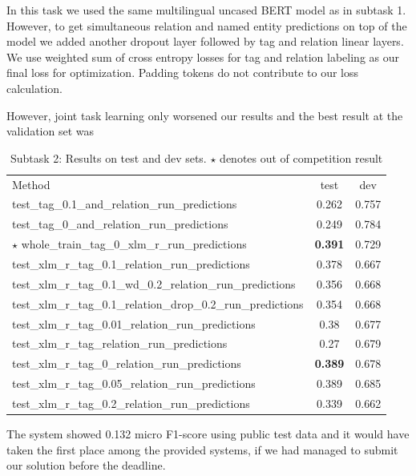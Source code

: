 \documentclass{dialogue}
\begin{document}
	In this task we used the same multilingual uncased BERT model as in subtask 1. However, to get simultaneous relation and named entity predictions on top of the model we added another dropout layer followed by tag and relation linear layers. We use weighted sum of cross entropy losses for tag and relation labeling as our final loss for optimization. Padding tokens do not contribute to our loss calculation.
	
	However, joint task learning only worsened our results and the best result at the validation set was
	
	\begin{table}[t!]
		\centering
		\scriptsize
		\begin{tabular}{lcc}%

			Method & test & dev \\

			test\_tag\_0.1\_and\_relation\_run\_predictions & 0.262 & 0.757 \\
			test\_tag\_0\_and\_relation\_run\_predictions & 0.249 & 0.784 \\

			$\star$ whole\_train\_tag\_0\_xlm\_r\_run\_predictions & {\bf 0.391} & 0.729 \\

			test\_xlm\_r\_tag\_0.1\_relation\_run\_predictions & 0.378 & 0.667 \\
			test\_xlm\_r\_tag\_0.1\_wd\_0.2\_relation\_run\_predictions & 0.356 & 0.668 \\
			test\_xlm\_r\_tag\_0.1\_relation\_drop\_0.2\_run\_predictions & 0.354 & 0.668 \\

			test\_xlm\_r\_tag\_0.01\_relation\_run\_predictions & 0.38 & 0.677 \\
			test\_xlm\_r\_tag\_relation\_run\_predictions & 0.27 & 0.679 \\
			test\_xlm\_r\_tag\_0\_relation\_run\_predictions & {\bf 0.389} & 0.678 \\
			test\_xlm\_r\_tag\_0.05\_relation\_run\_predictions & 0.389 & 0.685 \\
			test\_xlm\_r\_tag\_0.2\_relation\_run\_predictions & 0.339 & 0.662 \\ 
		\end{tabular}
		\caption{Subtask 2: Results on test and dev sets. $\star$ denotes out of competition result}
		\label{table:test_results_2}
	\end{table}
	
	The system showed 0.132 micro F1-score using public test data and it would have taken the first place among the provided systems, if we had managed to submit our solution before the deadline.
\end{document}
